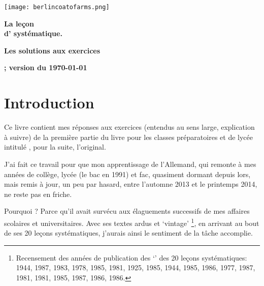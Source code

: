 \documentclass[
  12pt]
{scrbook}%
\newcommand\HUGE{\fontsize{50}{60} \selectfont}
\begin{document}
\begin{titlepage}
\begin{center}
\texttt{[image: berlincoatofarms.png]}
\begin{minipage}{0.45\textwidth}
\textbf{\HUGE La le\c con\\ d' syst\'ematique.}
\end{minipage}
\vspace*{\fill}

\textbf{\HUGE Les solutions aux exercices}

\vspace*{\fill}

\textbf{{}; version du \today}

\end{center}
\end{titlepage}

\chapter*{Introduction}

Ce livre contient mes r\'eponses aux exercices (entendus au sens large, explication \`a suivre) de la premi\`ere partie du livre pour les classes pr\'eparatoires et de lyc\'ee intitul\'e \emph{\ldaTTL}\citep{demarche1989}, pour la suite, l'\og original\fg. 

J'ai fait ce travail pour que mon apprentissage de l'Allemand, qui remonte \`a mes ann\'ees de coll\`ege, lyc\'ee (le bac en 1991) et fac, quasiment dormant depuis lors, mais remis \`a jour, un peu par hasard, entre l'automne 2013 et le printemps 2014, ne reste pas en friche. 

Pourquoi \emph{\ldaTTL}? Parce qu'il avait surv\'ecu aux \'elaguements successifs de mes affaires scolaires et universitaires. Avec ses textes ardus et `vintage' \footnote{Recensement des ann\'ees de publication des `\ldaTXT' des 20 le\c cons syst\'ematiques: 1944, 1987, 1983, 1978, 1985, 1981,  1925, 1985, 1944, 1985, 1986, 1977, 1987, 1981, 1981, 1985, 1987, 1986, 1986.}, en arrivant au bout de ses 20 le\c cons syst\'ematiques, j'aurais ainsi le sentiment de la t\^ache accomplie. 
\end{document}
